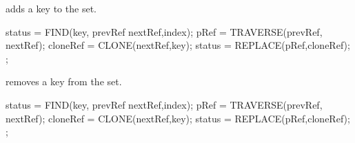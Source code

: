 \documentclass[11pt,onecolumn]{IEEEtran}
\begin{document}
\begin{algorithm}
  \caption{adds a key to the set.}
  \label{alg:add}
  \begin{algorithmic}[1]
    \Statex   
        \State status = FIND(key, prevRef nextRef,index);
          \State pRef = TRAVERSE(prevRef, nextRef);
            \State cloneRef = CLONE(nextRef,key);
            \State status = REPLACE(pRef,cloneRef);
              \State
              ;
            \EndIf
          \EndIf
        \Else
          \State
        \EndIf
      \EndWhile
    \EndFunction
  \end{algorithmic}
\end{algorithm}

\begin{algorithm}
  \caption{removes a key from the set.}
  \label{alg:remove}
  \begin{algorithmic}[1]
    \Statex   
        \State status = FIND(key, prevRef nextRef,index);
          \State pRef = TRAVERSE(prevRef, nextRef);
            \State cloneRef = CLONE(nextRef,key);
            \State status = REPLACE(pRef,cloneRef);
              \State
              ;
            \EndIf
          \EndIf
        \Else
          \State
        \EndIf
      \EndWhile
    \EndFunction
  \end{algorithmic}
\end{algorithm}




%


\end{document}

